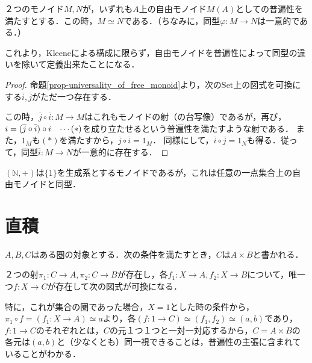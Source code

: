 \documentclass[uplatex, dvipdfmx]{jsreport}
\begin{document}
\begin{proposition}
    ２つのモノイド$M,N$が，いずれも$A$上の自由モノイド$M(A)$としての普遍性を満たすとする．この時，$M\simeq N$である．（ちなみに，同型$\varphi:M\to N$は一意的である．）
\end{proposition}
これより，Kleeneによる構成に限らず，自由モノイドを普遍性によって同型の違いを除いて定義出来たことになる．
\begin{proof}
    命題\ref{prop-universality_of_free_monoid}より，次の$\mathrm{Set}$上の図式を可換にする$\overline{i},\overline{j}$がただ一つ存在する．
    \begin{center}\end{center}
    この時，$\overline{j}\circ\overline{i}:M\to M$はこれもモノイドの射（の台写像）であるが，再び，$i=(\overline{j}\circ\overline{i})\circ i\hspace{3mm}\cdots (*)$を成り立たせるという普遍性を満たすような射である．
    また，$1_M$も$(*)$を満たすから，$\overline{j}\circ\overline{i}=1_M$．
    同様にして，$\overline{i}\circ\overline{j}=1_N$も得る．従って，同型$\overline{i}:M\to N$が一意的に存在する．
\end{proof}

\begin{example}
    $(\mathbb{N},+)$は$\{ 1\}$を生成系とするモノイドであるが，これは任意の一点集合上の自由モノイドと同型．
\end{example}

\section{直積}

\begin{shadebox}\begin{definition}[積の普遍性]
    $A,B,C$はある圏の対象とする．次の条件を満たすとき，$C$は$A\times B$と書かれる．

    ２つの射$\pi_1:C\to A,\pi_2:C\to B$が存在し，各$f_1:X\to A, f_2:X\to B$について，唯一つ$f:X\to C$が存在して次の図式が可換になる．

    \begin{center}\end{center}
\end{definition}\end{shadebox}
特に，これが集合の圏であった場合，$X=1$とした時の条件から，$\pi_1\circ f = (f_1:X\to A) \simeq a$より，各$(f:1\to C) \simeq (f_1,f_2) \simeq (a,b)$であり，$f:1\to C$のそれぞれとは，$C$の元１つ１つと一対一対応するから，$C=A\times B$の各元は$(a,b)$と（少なくとも）同一視できることは，普遍性の主張に含まれていることがわかる．
\end{document}
